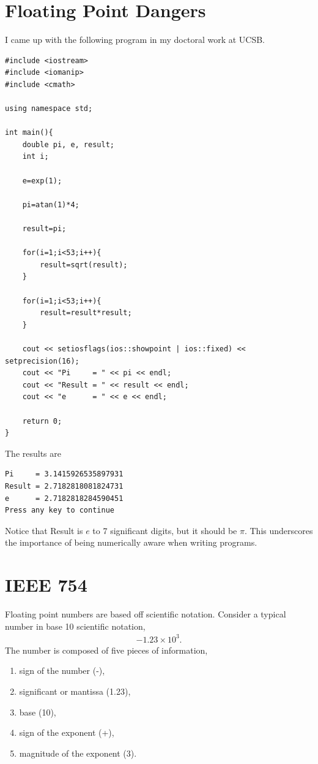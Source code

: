 \section{Floating Point Dangers}

I came up with the following program in my doctoral work at UCSB.

\begin{verbatim}
#include <iostream>
#include <iomanip>
#include <cmath>

using namespace std;

int main(){
    double pi, e, result;
    int i;

    e=exp(1);

    pi=atan(1)*4;

    result=pi;

    for(i=1;i<53;i++){
        result=sqrt(result);
    }

    for(i=1;i<53;i++){
        result=result*result;
    }

    cout << setiosflags(ios::showpoint | ios::fixed) << setprecision(16);
    cout << "Pi     = " << pi << endl;
    cout << "Result = " << result << endl;
    cout << "e      = " << e << endl;

    return 0;
}
\end{verbatim}

The results are

\begin{verbatim}
Pi     = 3.1415926535897931
Result = 2.7182818081824731
e      = 2.7182818284590451
Press any key to continue
\end{verbatim}

Notice that Result is $e$ to 7 significant digits, but it should be $\pi$.  This underscores the importance of being numerically aware when writing programs.


\section{IEEE 754}

Floating point numbers are based off scientific notation.  Consider a typical number in base 10 scientific notation,
\begin{eqnarray*}
  -1.23 \times 10^{3}.
\end{eqnarray*}
The number is composed of five pieces of information,
\begin{enumerate}
    \item sign of the number (-),
    \item significant or mantissa (1.23),
    \item base (10),
    \item sign of the exponent (+),
    \item magnitude of the exponent (3).
\end{enumerate}


